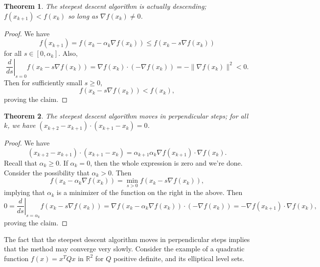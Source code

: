 \documentclass[11pt]{article}
\newcommand{\R}{\mathbb{R}}
\newtheorem{theorem}{Theorem}[section]
\begin{document}
\begin{theorem}
The steepest descent algorithm is actually descending; $f(x_{k+1}) < f(x_k)$ so long as $\nabla f(x_k) \neq 0$.
\end{theorem}
\begin{proof}
We have
\[
f(x_{k+1}) = f(x_k - \alpha_k \nabla f(x_k)) \leq f(x_k - s \nabla f(x_k))
\]
for all $s \in [0, \alpha_k]$. Also,
\[
\left. \frac{d}{ds} \right|_{s=0} f(x_k - s\nabla f(x_k)) = \nabla f(x_k) \cdot (-\nabla f(x_k)) = -\| \nabla f(x_k) \|^2 < 0.
\]
Then for sufficiently small $s \geq 0$,
\[
f(x_k - s\nabla f(x_k)) < f(x_k),
\]
proving the claim.
\end{proof}

\begin{theorem}
The steepest descent algorithm moves in perpendicular steps; for all $k$, we have $(x_{k+2} - x_{k+1})\cdot(x_{k+1} - x_k) = 0$.
\end{theorem}
\begin{proof}
We have
\[
(x_{k+2} - x_{k+1})\cdot(x_{k+1} - x_k) = \alpha_{k+1}\alpha_k \nabla f(x_{k+1}) \cdot \nabla f(x_k).
\]
Recall that $\alpha_k \geq 0$. If $\alpha_k = 0$, then the whole expression is zero and we're done. Consider the possibility that $\alpha_k > 0$. Then
\[
f(x_k - \alpha_k \nabla f(x_k)) = \min_{s > 0} f(x_k - s \nabla f(x_k)),
\]
implying that $\alpha_k$ is a minimizer of the function on the right in the above. Then
\[
0 = \left. \frac{d}{ds} \right|_{s=\alpha_k} f(x_k - s\nabla f(x_k)) = \nabla f(x_k - \alpha_k \nabla f(x_k)) \cdot (-\nabla f(x_k)) = -\nabla f(x_{k+1}) \cdot \nabla f(x_k),
\]
proving the claim.
\end{proof}

The fact that the steepest descent algorithm moves in perpendicular steps implies that the method may converge very slowly. Consider the example of a quadratic function $f(x) = x^TQx$ in $\R^2$ for $Q$ positive definite, and its elliptical level sets. 
\end{document}
